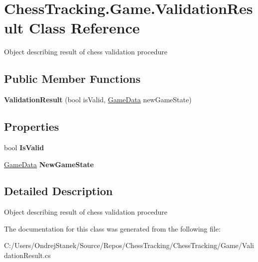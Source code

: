 \hypertarget{class_chess_tracking_1_1_game_1_1_validation_result}{}\section{Chess\+Tracking.\+Game.\+Validation\+Result Class Reference}
\label{class_chess_tracking_1_1_game_1_1_validation_result}


Object describing result of chess validation procedure  


\subsection*{Public Member Functions}
\begin{DoxyCompactItemize}
\item 
\mbox{\label{class_chess_tracking_1_1_game_1_1_validation_result_ad497422d6101f96179eaf1c43dc1f0b0}} 
{\bfseries Validation\+Result} (bool is\+Valid, \mbox{\hyperlink{class_chess_tracking_1_1_game_1_1_game_data}{Game\+Data}} new\+Game\+State)
\end{DoxyCompactItemize}
\subsection*{Properties}
\begin{DoxyCompactItemize}
\item 
\mbox{\label{class_chess_tracking_1_1_game_1_1_validation_result_aab91b8bf22660feae4c2eb809c6285bd}} 
bool {\bfseries Is\+Valid}
\item 
\mbox{\label{class_chess_tracking_1_1_game_1_1_validation_result_a4b281d75fd25845b372ce7d6e093539b}} 
\mbox{\hyperlink{class_chess_tracking_1_1_game_1_1_game_data}{Game\+Data}} {\bfseries New\+Game\+State}
\end{DoxyCompactItemize}


\subsection{Detailed Description}
Object describing result of chess validation procedure 



The documentation for this class was generated from the following file\+:\begin{DoxyCompactItemize}
\item 
C\+:/\+Users/\+Ondrej\+Stanek/\+Source/\+Repos/\+Chess\+Tracking/\+Chess\+Tracking/\+Game/Validation\+Result.\+cs\end{DoxyCompactItemize}
